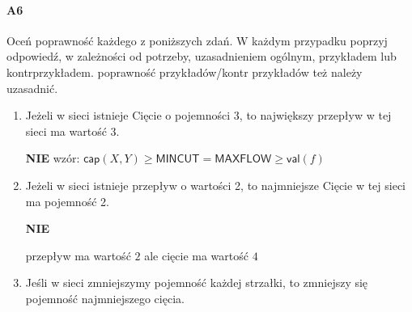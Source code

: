 \documentclass[a4paper,12pt]{article}
\theoremstyle{definition}%
\theoremstyle{definition}
\theoremstyle{problem}
\begin{document}
\paragraph{A6} Oceń poprawność każdego z poniższych zdań. W każdym przypadku poprzyj odpowiedź, w zależności
od potrzeby, uzasadnieniem ogólnym, przykładem lub kontrprzykładem. poprawność przykładów/kontr przykładów też należy uzasadnić.
\begin{enumerate}[label=\alph*)]
\item Jeżeli w sieci istnieje Cięcie o pojemności 3, to największy przepływ w tej sieci ma wartość 3.

\textbf{NIE} wzór: $\mathsf{cap}(X,Y)\geq \mathsf{MINCUT}=\mathsf{MAXFLOW}\geq \mathsf{val}(f)$
\begin{figure}[H]
\centering
{}
\end{figure} 
\item Jeżeli w sieci istnieje przepływ o wartości 2, to najmniejsze Cięcie w tej sieci ma pojemność 2.

\textbf{NIE}
\begin{figure}[H]
\centering
{}
\end{figure} 
przepływ ma wartość $2$ ale cięcie ma wartość $4$
\item Jeśli w sieci zmniejszymy pojemność każdej strzałki, to zmniejszy się pojemność najmniejszego cięcia.


\end{enumerate}
\end{document}
